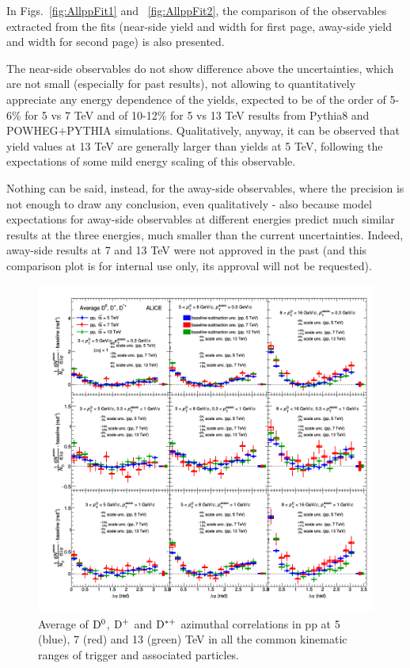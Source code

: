 In Figs.~\ref{fig:AllppFit1} and ~\ref{fig:AllppFit2}, the comparison of the observables extracted from the fits (near-side yield and width for first page, away-side yield and width for second page) is also presented. 

The near-side observables do not show difference above the uncertainties, which are not small (especially for past results), not allowing to quantitatively appreciate any energy dependence of the yields, expected to be of the order of 5-6\% for 5 vs 7 TeV and of 10-12\% for 5 vs 13 TeV results from Pythia8 and POWHEG$+$PYTHIA simulations. Qualitatively, anyway, it can be observed that yield values at 13 TeV are generally larger than yields at 5 TeV, following the expectations of some mild energy scaling of this observable.

Nothing can be said, instead, for the away-side observables, where the precision is not enough to draw any conclusion, even qualitatively - also because model expectations for away-side observables at different energies predict much similar results at the three energies, much smaller than the current uncertainties. Indeed, away-side results at 7 and 13 TeV were not approved in the past (and this comparison plot is for internal use only, its approval will not be requested).

\begin{figure}
\centering
\includegraphics[width=1.1\textwidth, angle=270]{figures/ComparisonToOtherpp/plotComparison_WeightedAverage_pp_vsEnergies_UniqueCanvas_Style1.png}
\caption{Average of ${\rm D^0}$, ${\rm D^+}$ and ${\rm D^{*+}}$ azimuthal correlations in pp at 5 (blue), 7 (red) and 13 (green) TeV in all the common kinematic ranges of trigger and associated particles.}
\label{fig:Allpp}
\end{figure}

